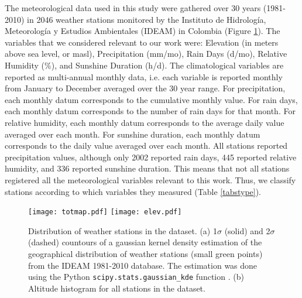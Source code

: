 \documentclass[12pt]{iopart}
\begin{document}
The meteorological data used in this study were gathered over 30 years (1981-2010) in 2046 weather stations monitored by the Instituto de Hidrolog\'ia, Meteorolog\'ia y Estudios Ambientales (IDEAM) in Colombia (Figure \ref{totmap}). The  variables that we considered relevant to our work were: Elevation (in meters above sea level, or masl), Precipitation (mm/mo), Rain Days (d/mo),  Relative Humidity (\%), and Sunshine Duration (h/d). The climatological variables are reported as multi-annual monthly data, i.e. each variable is reported monthly from January to December averaged over the 30 year range. For precipitation, each monthly datum corresponds to the cumulative monthly value.  For rain days, each monthly datum corresponds to the number of rain days for that month.  For relative humidity, each monthly datum corresponds to the  average daily value averaged over each month. For sunshine duration, each monthly datum corresponds to the daily value averaged over each month. All stations reported precipitation values, although only 2002 reported rain days, 445 reported relative humidity, and 336 reported sunshine duration. This means that not all stations registered all the meteorological variables relevant to this work. Thus, we classify stations according to which variables they measured (Table \ref{tabstype}).\\

\begin{figure}
\begin{center}
\texttt{[image: totmap.pdf]}
\texttt{[image: elev.pdf]}
\caption{Distribution of weather stations in the dataset. (a) 1$\sigma$ (solid) and 2$\sigma$ (dashed) countours of a gaussian kernel density estimation of the geographical distribution of weather stations (small green points) from the IDEAM 1981-2010 database. The estimation was done using the Python \texttt{scipy.stats.gaussian\_kde}  function \cite{scipy}. (b) Altitude histogram for all stations in the dataset.}\label{totmap}
\end{center}
\end{figure}
\end{document}
